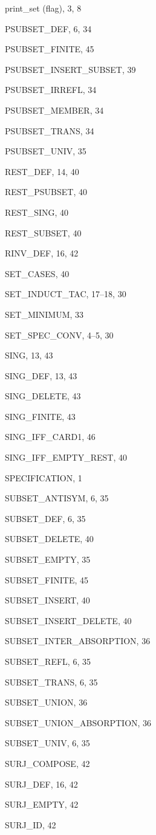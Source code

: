 \begin{theindex}
  \indexspace

  \item {\ptt print\_set} (flag), 3, 8
  \item {\ptt PSUBSET\_DEF}, 6, 34
  \item {\ptt PSUBSET\_FINITE}, 45
  \item {\ptt PSUBSET\_INSERT\_SUBSET}, 39
  \item {\ptt PSUBSET\_IRREFL}, 34
  \item {\ptt PSUBSET\_MEMBER}, 34
  \item {\ptt PSUBSET\_TRANS}, 34
  \item {\ptt PSUBSET\_UNIV}, 35

  \indexspace

  \item {\ptt REST\_DEF}, 14, 40
  \item {\ptt REST\_PSUBSET}, 40
  \item {\ptt REST\_SING}, 40
  \item {\ptt REST\_SUBSET}, 40
  \item {\ptt RINV\_DEF}, 16, 42

  \indexspace

  \item {\ptt SET\_CASES}, 40
  \item {\ptt SET\_INDUCT\_TAC}, 17--18, 30
  \item {\ptt SET\_MINIMUM}, 33
  \item {\ptt SET\_SPEC\_CONV}, 4--5, 30
  \item {\ptt SING}, 13, 43
  \item {\ptt SING\_DEF}, 13, 43
  \item {\ptt SING\_DELETE}, 43
  \item {\ptt SING\_FINITE}, 43
  \item {\ptt SING\_IFF\_CARD1}, 46
  \item {\ptt SING\_IFF\_EMPTY\_REST}, 40
  \item {\ptt SPECIFICATION}, 1
  \item {\ptt SUBSET\_ANTISYM}, 6, 35
  \item {\ptt SUBSET\_DEF}, 6, 35
  \item {\ptt SUBSET\_DELETE}, 40
  \item {\ptt SUBSET\_EMPTY}, 35
  \item {\ptt SUBSET\_FINITE}, 45
  \item {\ptt SUBSET\_INSERT}, 40
  \item {\ptt SUBSET\_INSERT\_DELETE}, 40
  \item {\ptt SUBSET\_INTER\_ABSORPTION}, 36
  \item {\ptt SUBSET\_REFL}, 6, 35
  \item {\ptt SUBSET\_TRANS}, 6, 35
  \item {\ptt SUBSET\_UNION}, 36
  \item {\ptt SUBSET\_UNION\_ABSORPTION}, 36
  \item {\ptt SUBSET\_UNIV}, 6, 35
  \item {\ptt SURJ\_COMPOSE}, 42
  \item {\ptt SURJ\_DEF}, 16, 42
  \item {\ptt SURJ\_EMPTY}, 42
  \item {\ptt SURJ\_ID}, 42


\end{theindex}

